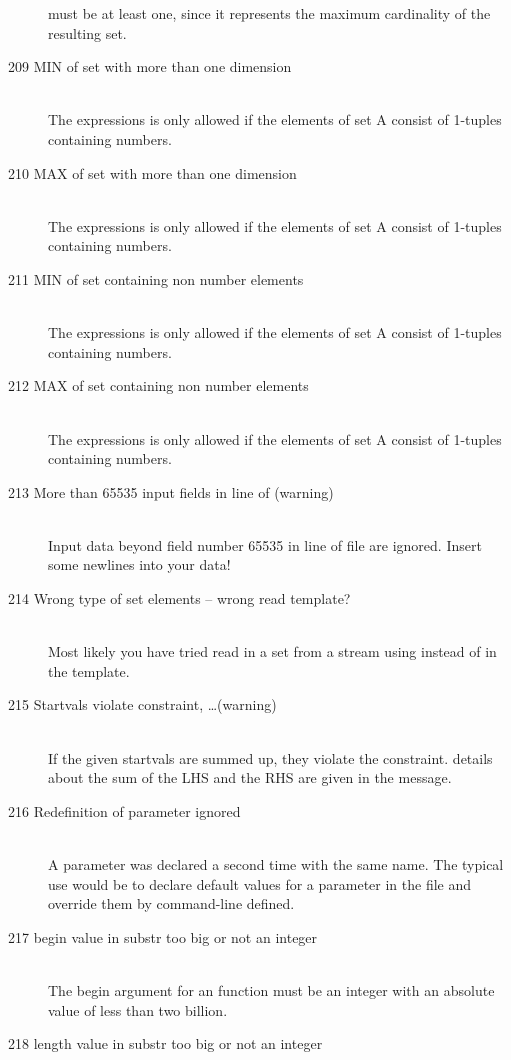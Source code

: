 \begin{description}
   must be at least one, since it represents the maximum cardinality
   of the resulting set.
\item[209 MIN of set with more than one dimension]\ \\
   The expressions  is only allowed if the elements of 
   set A consist of 1-tuples containing numbers.  
\item[210 MAX of set with more than one dimension]\ \\
   The expressions  is only allowed if the elements of 
   set A consist of 1-tuples containing numbers.  
\item[211 MIN of set containing non number elements]\ \\
   The expressions  is only allowed if the elements of 
   set A consist of 1-tuples containing numbers.  
\item[212 MAX of set containing non number elements]\ \\
   The expressions  is only allowed if the elements of 
   set A consist of 1-tuples containing numbers.  
\item[213 More than 65535 input fields in line \code{xxx} of
   \code{yyy} (warning)]\ \\
   Input data beyond field number 65535 in line  of file
    are ignored. Insert some newlines into your data!
\item[214 Wrong type of set elements -- wrong read template?]\ \\
   Most likely you have tried read in a set from a stream using
    instead of  in the template. 
\item[215 Startvals violate constraint, \ldots (warning)]\ \\
   If the given startvals are summed up, they violate the
   constraint. details about the sum of the LHS and the RHS are given
   in the message.
\item[216 Redefinition of parameter \code{xxx} ignored]\ \\
   A parameter was declared a second time with the same name. The
   typical use would be to declare default values for a parameter in
   the \zimpl file and override them by command-line defined.
\item[217 begin value \code{xxx} in substr too big or not an integer]\ \\
   The begin argument for an  function
   must be an integer with an absolute value of less than two billion.
\item[218 length value \code{xxx} in substr too big or not an integer]\ \\

\end{description}
